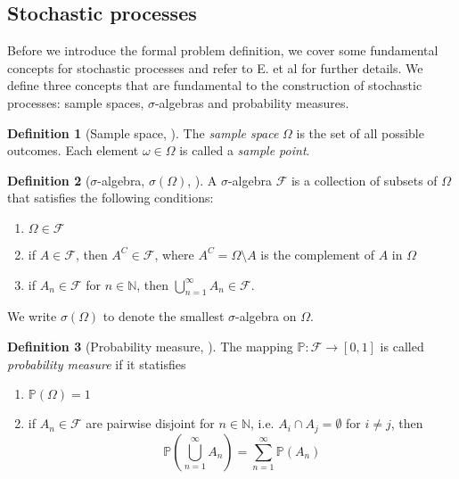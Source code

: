 \documentclass[12pt]{article}
\theoremstyle{definition}
\newtheorem{definition}[definition]{Definition}
\numberwithin{equation}{section}
\newcommand{\N}{\mathbb{N}}
\newcommand{\BP}{\mathbb{P}}
\newcommand{\CF}{\mathcal{F}}
\begin{document}
 \subsection{Stochastic processes}
 Before we introduce the formal problem definition, we cover some fundamental concepts for stochastic processes and refer to E. et al \cite{eAppliedStochasticAnalysis2021} for further details. We define three concepts that are fundamental to the construction of stochastic processes: sample spaces, $\sigma$-algebras and probability measures.
 \begin{definition}[Sample space,  ]
   The \emph{sample space} $\Omega$ is the set of all possible outcomes. Each element $\omega \in \Omega$ is called a \emph{sample point}.
 \end{definition}
 \begin{definition}[$\sigma$-algebra, $\sigma(\Omega)$, ]
   A $\sigma$-algebra $\CF$ is a collection of subsets of $\Omega$ that satisfies the following conditions:
   \begin{enumerate}[label=(\roman*)]
     \item $\Omega \in \CF$
     \item if $A \in \CF$, then $A^C \in \CF$, where $A^C = \Omega \setminus A$ is the complement of $A$ in $\Omega$
     \item if $A_n \in \CF$ for $n \in \N$, then $\bigcup_{n=1}^{\infty} A_n \in \CF$.
   \end{enumerate}
   We write $\sigma(\Omega)$ to denote the smallest $\sigma$-algebra on $\Omega$.
 \end{definition}
 \begin{definition}[Probability measure, ]
   The mapping $\BP : \CF \rightarrow [0,1]$ is called \emph{probability measure} if it statisfies
   \begin{enumerate}[label=(\roman*)]
     \item $\BP(\Omega) = 1$
     \item if $A_n \in \CF$ are pairwise disjoint for $n\in\N$, i.e. $A_i \cap A_j = \emptyset$ for $i \neq j$, then
     \begin{equation*}
       \BP(\bigcup_{n=1}^{\infty}A_n) = \sum_{n=1}^{\infty}\BP(A_n)
     \end{equation*}
   \end{enumerate}
 \end{definition}
\end{document}
